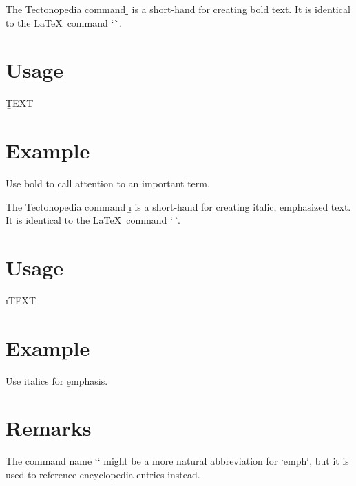 
The Tectonopedia command \b{\string\b} is a short-hand for creating bold text.
It is identical to the \LaTeX\ command \tex`\textbf`.

\section*{Usage}

\begin{texdisp}
\b{TEXT}
\end{texdisp}

\section*{Example}

\begin{texdisp}
Use bold to \b{call attention} to an important term.
\end{texdisp}



The Tectonopedia command \b{\string\i} is a short-hand for creating italic,
emphasized text. It is identical to the \LaTeX\ command \tex`\emph`.

\section*{Usage}

\begin{texdisp}
\i{TEXT}
\end{texdisp}

\section*{Example}

\begin{texdisp}
Use italics for \b{emphasis}.
\end{texdisp}

\section*{Remarks}

The command name \tex`\e` might be a more natural abbreviation for \tex`emph`,
but it is used to reference encyclopedia entries instead.
